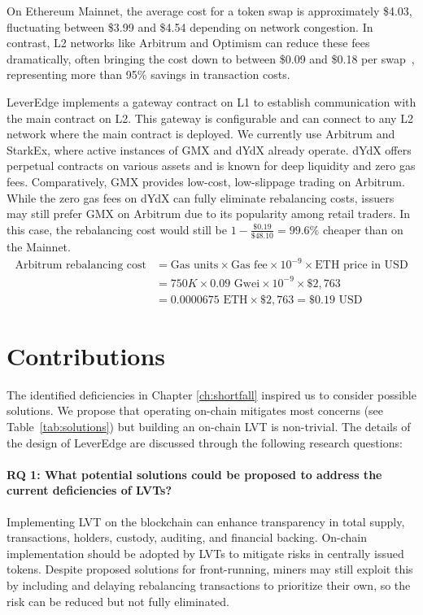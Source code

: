 \begin{example}
	On Ethereum Mainnet, the average cost for a token swap is approximately \$4.03, fluctuating between \$3.99 and \$4.54 depending on network congestion. In contrast, L2 networks like Arbitrum and Optimism can reduce these fees dramatically, often bringing the cost down to between \$0.09 and \$0.18 per swap~\cite{dailycoin2024}, representing more than 95\% savings in transaction costs.
\end{example}

LeverEdge implements a gateway contract on L1 to establish communication with the main contract on L2. This gateway is configurable and can connect to any L2 network where the main contract is deployed. We currently use Arbitrum and StarkEx, where active instances of GMX and dYdX already operate. dYdX offers perpetual contracts on various assets and is known for deep liquidity and zero gas fees. Comparatively, GMX provides low-cost, low-slippage trading on Arbitrum. While the zero gas fees on dYdX can fully eliminate rebalancing costs, issuers may still prefer GMX on Arbitrum due to its popularity among retail traders. In this case, the rebalancing cost would still be \(1-\frac{\$0.19}{\$48.10}=99.6\%\) cheaper than on the Mainnet.
\begin{equation*}
	\begin{aligned}
		\text{Arbitrum rebalancing cost} & = \text{Gas units} \times \text{Gas fee} \times 10^{-9} \times \text{ETH price in USD} \\
		& = 750K \times 0.09 \text{ Gwei} \times 10^{-9} \times \$2,763 \\
		& = 0.0000675 \text{ ETH} \times \$2,763 = \$0.19 \text{ USD}
	\end{aligned}
\end{equation*}

\section{Contributions}
The identified deficiencies in Chapter \ref{ch:shortfall} inspired us to consider possible solutions. We propose that operating on-chain mitigates most concerns (see Table~\ref{tab:solutions}) but building an on-chain LVT is non-trivial. The details of the design of LeverEdge are discussed through the following research questions:

\paragraph{RQ 1: What potential solutions could be proposed to address the current deficiencies of LVTs?} Implementing LVT on the blockchain can enhance transparency in total supply, transactions, holders, custody, auditing, and financial backing. On-chain implementation should be adopted by LVTs to mitigate risks in centrally issued tokens. Despite proposed solutions for front-running, miners may still exploit this by including and delaying rebalancing transactions to prioritize their own, so the risk can be reduced but not fully eliminated.

